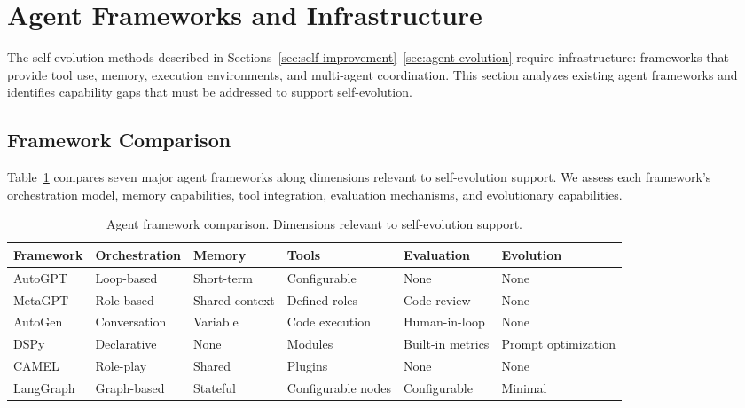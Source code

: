\documentclass[11pt,a4paper]{article}
\begin{document}
\section{Agent Frameworks and Infrastructure}
\label{sec:frameworks}

The self-evolution methods described in Sections~\ref{sec:self-improvement}--\ref{sec:agent-evolution} require infrastructure: frameworks that provide tool use, memory, execution environments, and multi-agent coordination. This section analyzes existing agent frameworks and identifies capability gaps that must be addressed to support self-evolution.

\subsection{Framework Comparison}

Table~\ref{tab:frameworks} compares seven major agent frameworks along dimensions relevant to self-evolution support. We assess each framework's orchestration model, memory capabilities, tool integration, evaluation mechanisms, and evolutionary capabilities.

\begin{table}[t]
\centering
\caption{Agent framework comparison. Dimensions relevant to self-evolution support.}
\label{tab:frameworks}
\small
\begin{tabular}{@{}p{1.5cm}p{2cm}p{1.5cm}p{1.5cm}p{1.5cm}p{2cm}@{}}
\toprule
\textbf{Framework} & \textbf{Orchestration} & \textbf{Memory} & \textbf{Tools} & \textbf{Evaluation} & \textbf{Evolution} \\
\midrule
AutoGPT~\citep{autogpt2023} & Loop-based & Short-term & Configurable & None & None \\
MetaGPT~\citep{hong2023metagpt} & Role-based & Shared context & Defined roles & Code review & None \\
AutoGen~\citep{wu2023autogen} & Conversation & Variable & Code execution & Human-in-loop & None \\
DSPy~\citep{khattab2023dspy} & Declarative & None & Modules & Built-in metrics & Prompt optimization \\
CAMEL~\citep{li2023camel} & Role-play & Shared & Plugins & None & None \\
LangGraph & Graph-based & Stateful & Configurable nodes & Configurable & Minimal \\
\bottomrule
\end{tabular}
\end{table}
\end{document}
